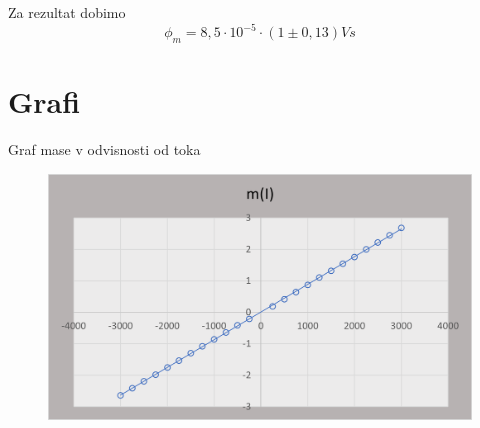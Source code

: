 \documentclass[a4paper]{report}
\begin{document}
\noindent Za rezultat dobimo 
\[\phi_m = 8,5 \cdot 10^{-5}\cdot(1 \pm 0,13)Vs\]

\chapter*{Grafi}

Graf mase v odvisnosti od toka\\
\begin{figure}[h]
\centering
\includegraphics[width=\textwidth]{Graf}
\end{figure}
\end{document}
